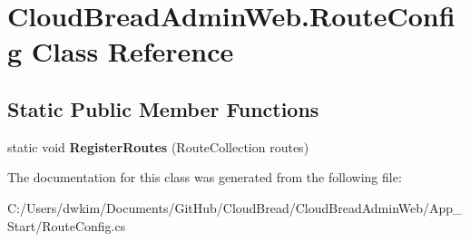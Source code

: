 \hypertarget{class_cloud_bread_admin_web_1_1_route_config}{}\section{Cloud\+Bread\+Admin\+Web.\+Route\+Config Class Reference}
\label{class_cloud_bread_admin_web_1_1_route_config}
\subsection*{Static Public Member Functions}
\begin{DoxyCompactItemize}
\item 
static void {\bfseries Register\+Routes} (Route\+Collection routes)\hypertarget{class_cloud_bread_admin_web_1_1_route_config_ae7523a12bc762c0517c47f2e0cbd9f65}{}\label{class_cloud_bread_admin_web_1_1_route_config_ae7523a12bc762c0517c47f2e0cbd9f65}

\end{DoxyCompactItemize}


The documentation for this class was generated from the following file\+:\begin{DoxyCompactItemize}
\item 
C\+:/\+Users/dwkim/\+Documents/\+Git\+Hub/\+Cloud\+Bread/\+Cloud\+Bread\+Admin\+Web/\+App\+\_\+\+Start/Route\+Config.\+cs\end{DoxyCompactItemize}
